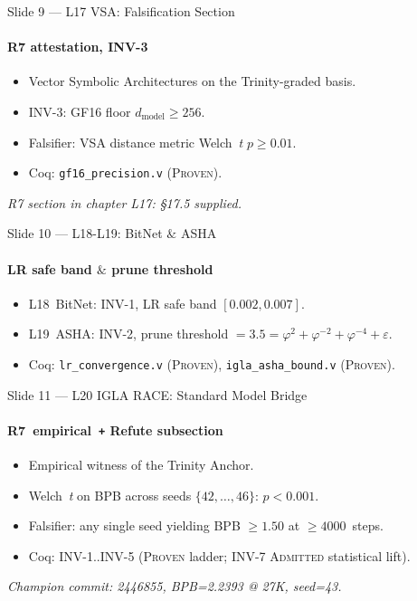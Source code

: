 \documentclass[10pt,aspectratio=169]{beamer}
\begin{document}
\begin{frame}{Slide 9 — L17 VSA: Falsification Section}
  \framesubtitle{R7 attestation, INV-3}
  \begin{itemize}
    \item Vector Symbolic Architectures on the Trinity-graded basis.
    \item INV-3: GF16 floor \(d_{\mathrm{model}} \ge 256\).
    \item Falsifier: VSA distance metric Welch~\textit{t} \(p\ge0.01\).
    \item Coq: \texttt{gf16\_precision.v} (\textsc{Proven}).
  \end{itemize}
  \vfill
  \footnotesize\emph{R7 section in chapter L17: \S 17.5 supplied.}
\end{frame}

\begin{frame}{Slide 10 — L18-L19: BitNet \(\&\) ASHA}
  \framesubtitle{LR safe band \(\&\) prune threshold}
  \begin{itemize}
    \item L18~BitNet: INV-1, LR safe band \([0.002, 0.007]\).
    \item L19~ASHA: INV-2, prune threshold
      \(=3.5=\varphi^{2}+\varphi^{-2}+\varphi^{-4}+\varepsilon\).
    \item Coq: \texttt{lr\_convergence.v} (\textsc{Proven}),
      \texttt{igla\_asha\_bound.v} (\textsc{Proven}).
  \end{itemize}
\end{frame}


\begin{frame}{Slide 11 — L20 IGLA RACE: Standard Model Bridge}
  \framesubtitle{R7~empirical~\texttt{+} Refute subsection}
  \begin{itemize}
    \item Empirical witness of the Trinity Anchor.
    \item Welch~\textit{t} on BPB across seeds \(\{42, \ldots, 46\}\):
      \(p < 0.001\).
    \item Falsifier: any single seed yielding BPB \(\ge 1.50\) at
      \(\ge 4000\)~steps.
    \item Coq: INV-1..INV-5 (\textsc{Proven} ladder; INV-7
      \textsc{Admitted} statistical lift).
  \end{itemize}
  \vfill
  \footnotesize\emph{Champion commit: 2446855, BPB=2.2393 @ 27K, seed=43.}
\end{frame}
\end{document}
